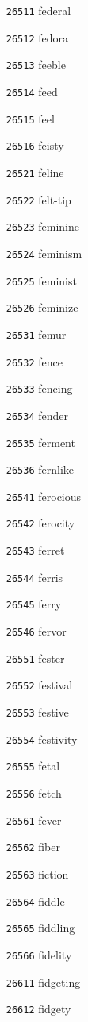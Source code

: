 \documentclass[twoside,11pt]{article}
\begin{document}
\begin{multicols}{5}
\begin{enumerate}
\item[\texttt{26511}] federal
\item[\texttt{26512}] fedora
\item[\texttt{26513}] feeble
\item[\texttt{26514}] feed
\item[\texttt{26515}] feel
\item[\texttt{26516}] feisty
\item[\texttt{26521}] feline
\item[\texttt{26522}] felt-tip
\item[\texttt{26523}] feminine
\item[\texttt{26524}] feminism
\item[\texttt{26525}] feminist
\item[\texttt{26526}] feminize
\item[\texttt{26531}] femur
\item[\texttt{26532}] fence
\item[\texttt{26533}] fencing
\item[\texttt{26534}] fender
\item[\texttt{26535}] ferment
\item[\texttt{26536}] fernlike
\item[\texttt{26541}] ferocious
\item[\texttt{26542}] ferocity
\item[\texttt{26543}] ferret
\item[\texttt{26544}] ferris
\item[\texttt{26545}] ferry
\item[\texttt{26546}] fervor
\item[\texttt{26551}] fester
\item[\texttt{26552}] festival
\item[\texttt{26553}] festive
\item[\texttt{26554}] festivity
\item[\texttt{26555}] fetal
\item[\texttt{26556}] fetch
\item[\texttt{26561}] fever
\item[\texttt{26562}] fiber
\item[\texttt{26563}] fiction
\item[\texttt{26564}] fiddle
\item[\texttt{26565}] fiddling
\item[\texttt{26566}] fidelity
\item[\texttt{26611}] fidgeting
\item[\texttt{26612}] fidgety

\end{enumerate}
\end{multicols}
\end{document}
